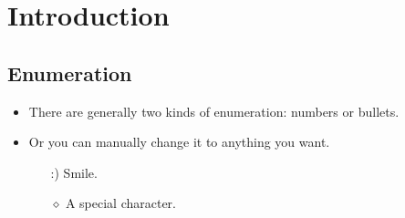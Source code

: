 \documentclass[11pt]{amsart}
\theoremstyle{plain}%
\theoremstyle{definition}
\theoremstyle{remark}
\numberwithin{equation}{section}
\begin{document}
\section{Introduction}
\subsection{Enumeration}
\begin{itemize}
    \item There are generally two kinds of enumeration: numbers or bullets.
    \item Or you can manually change it to anything you want.
        \begin{enumerate}
            \item[:)] Smile.
            \item[$\diamond$] A special character.
        \end{enumerate}
\end{itemize}
\end{document}
